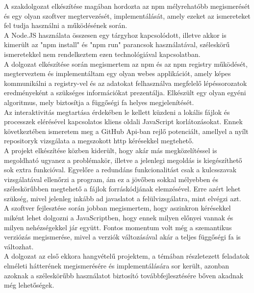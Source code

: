 
A szakdolgozat elkészítése magában hordozta az npm mélyrehatóbb megismerését és egy olyan szoftver megtervezését, implementálását, amely ezeket az ismereteket fel tudja használni a működésének során.\\

A Node.JS használata összesen egy tárgyhoz kapcsolódott, illetve akkor is kimerült az "npm install" és "npm run" parancsok használatával, széleskörű ismeretekkel nem rendelkeztem ezen technológiával kapcsolatban.\\

A dolgozat elkészítése során megismertem az npm és az npm registry működését, megterveztem és implementáltam egy olyan webes applikációt, amely képes kommunikálni a registry-vel és az adatokat felhasználva megfelelő lépéssorozatok eredményeként a szükséges információkat prezentálja. Elkészült egy olyan egyéni algoritmus, mely biztosítja a függőségi fa helyes megjelenítését.\\

Az interaktivitás megtartása érdekében le kellett küzdeni a lokális fájlok és processzek elérésével kapcsolatos kliens oldali JavaScript korlátozásokat. Ennek következtében ismeretem meg a GitHub Api-ban rejlő potenciált, amellyel a nyílt repositoryk vizsgálata a megszokott http kérésekkel megtehető.\\

A projekt elkészítése közben kiderült, hogy akár más megközelítéssel is megoldható ugyanez a problémakör, illetve a jelenlegi megoldás is kiegészíthető sok extra funkcióval. Egyelőre a redundáns funkcionalitást csak a kulcsszavak vizsgálatával ellenőrzi a program, ám ez a jövőben sokkal mélyebben és széleskörűbben megtehető a fájlok forráskódjának elemzésével. Erre azért lehet szükség, mivel jelenleg inkább ad javaslatot a felülvizsgálatra, mint elvégzi azt.\\

A szoftver fejlesztése során jobban megismertem, hogy aszinkron kérésekkel miként lehet dolgozni a JavaScriptben, hogy ennek milyen előnyei vannak és milyen nehézségekkel jár együtt. Fontos momentum volt még a szemantikus verziózás megismerése, mivel a verziók változásával akár a teljes függőségi fa is változhat.\\

A dolgozat az első ekkora hangvételű projektem, a témában részletezett feladatok elméleti hátterének megismerésére és implementálására sor került, azonban azoknak a széleskörűbb használatot biztosító továbbfejlesztésére bőven akadnak még lehetőségek.

 



